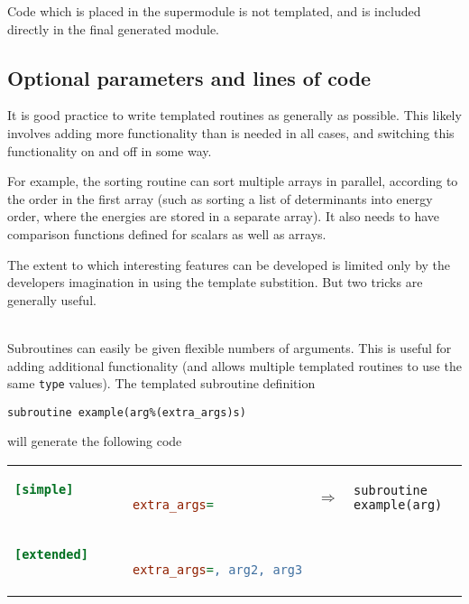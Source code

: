 \documentclass[a4paper,notitlepage]{scrreprt}
\newcommand\headitem[1]{\needspace{1.5\baselineskip}\item[{\boldmath #1 \nopagebreak}] \hfill \\ \nopagebreak}
\let\code\lstinline
\begin{document}
{{	Code which is placed in the supermodule is not templated, and is included
	directly in the final generated module.

\subsection{Optional parameters and lines of code}
	It is good practice to write templated routines as generally as possible.
	This likely involves adding more functionality than is needed in all cases,
	and switching this functionality on and off in some way.
	
	For example, the sorting routine can sort multiple arrays in parallel,
	according to the order in the first array (such as sorting a list of
	determinants into energy order, where the energies are stored in a separate
	array). It also needs to have comparison functions defined for scalars as
	well as arrays.
	
	The extent to which interesting features can be developed is limited only
	by the developers imagination in using the template substition. But two
	tricks are generally useful.
	
		\begin{description}
		\headitem{Additional optional arguments}
			Subroutines can easily be given flexible numbers of arguments. This
			is useful for adding additional functionality (and allows multiple
			templated routines to use the same \code{type} values). The
			templated subroutine definition
			\begin{lstlisting}[gobble=12]
				subroutine example(arg%(extra_args)s)
			\end{lstlisting}
			will generate the following code
			
			\begin{minipage}{\textwidth}
			\begin{tabular}{lcl}
			\begin{lstlisting}[language=ini,gobble=16]
				[simple]
				extra_args=
			\end{lstlisting}
			& $\Longrightarrow$ &
			\begin{lstlisting}[gobble=16]
				subroutine example(arg)
			\end{lstlisting} \\[1.5em]
		
			\begin{lstlisting}[language=ini,gobble=16]
				[extended]
				extra_args=, arg2, arg3
			\end{lstlisting}


\end{tabular}
\end{minipage}
\end{description}}}
\end{document}
